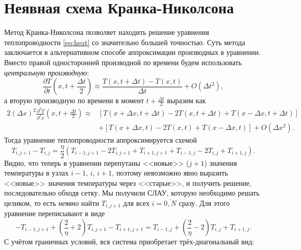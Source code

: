 \documentclass[12pt]{article}
\begin{document}
\section*{Неявная схема Кранка-Николсона}
Метод Кранка-Николсона позволяет находить решение уравнения теплопроводности \eqref{eq:heat} со значительно большей точностью. Суть метода заключается в альтернативном способе аппроксимации производных в уравнении. Вместо правой односторонней производной по времени будем использовать \textit{центральную производную}:
%
\begin{equation}
\frac{\partial T}{\partial t}\left(x,t+\frac{\Delta t}{2}\right)\approx \frac{T(x,t+\Delta t)-T(x,t)}{\Delta t}+O(\Delta t^2),
\end{equation}
%
а вторую производную по времени в момент $t+\frac{\Delta t}{2}$ выразим как
%
\begin{equation}
\begin{split}
2(\Delta x)^2\frac{\partial^2 T}{\partial^2 x}\left(x,t+\frac{\Delta t}{2}\right)\approx & \left[T(x+\Delta x,t+\Delta t)-2T(x,t+\Delta t)+T(x-\Delta x, t+\Delta t)\right]\\
& + \left[T(x+\Delta x,t)-2T(x,t)+T(x-\Delta x, t)\right]+O(\Delta x^2).
\end{split}
\end{equation}
%
Тогда уравнение теплопроводности аппроксимируется схемой
%
\begin{equation}
T_{i,j+1}-T_{i,j}=\frac{\eta}{2}\left(T_{i-1,j+1}-2T_{i,j+1}+T_{i+1,j+1}+T_{i-1,j}-2T_{i,j}+T_{i+1,j}\right).
\end{equation}
%
Видно, что теперь в уравнении перепутаны <<новые>> ($j+1$) значения температуры в узлах $i-1,\,i,\,i+1$, поэтому невозможно явно выразить <<новые>> значения температуры через <<старые>>, и получить решение, последовательно обходя сетку. Мы получили СЛАУ, которую необходимо решать целиком, то есть \textit{неявно} найти $T_{i,j+1}$ для всех $i=\overline{0,N}$ сразу. Для этого уравнение переписывают в виде
%
\begin{equation}
-T_{i-1,j+1}+\left(\frac{2}{\eta}+2\right)T_{i,j+1}-T_{i+1,j+1}=T_{i-1,j}+\left(\frac{2}{\eta}-2\right)T_{i,j}+T_{i+1,j}.
\end{equation}
%
С учётом граничных условий, вся система приобретает трёх-диагональный вид:
%
\end{document}
